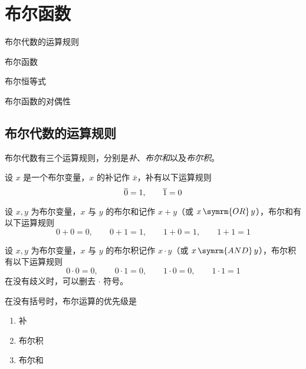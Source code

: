 \section{布尔函数}
\begin{introduction}
    \item 布尔代数的运算规则
    \item 布尔函数
    \item 布尔恒等式
    \item 布尔函数的对偶性
\end{introduction}

\subsection{布尔代数的运算规则}
布尔代数有三个运算规则，分别是\emph{补}、\emph{布尔和}以及\emph{布尔积}。

\begin{definition}[补]\label{def:补}
    设 $x$ 是一个布尔变量，$x$ 的补记作 $\bar{x}$，补有以下运算规则
    \begin{equation*}
        \bar{0} = 1, \qquad \bar{1} = 0 \\
    \end{equation*}
\end{definition}
\begin{definition}[布尔和]\label{def:布尔和}
    设 $x, y$ 为布尔变量，$x$ 与 $y$ 的布尔和记作 $x + y$（或 $x \mathop{\symrm{OR}} y$），布尔和有以下运算规则
    \begin{equation*}
        0 + 0 = 0, \qquad 0 + 1 = 1, \qquad 1 + 0 = 1, \qquad 1 + 1 = 1
    \end{equation*}
\end{definition}
\begin{definition}[布尔积]\label{def:布尔积}
    设 $x, y$ 为布尔变量，$x$ 与 $y$ 的布尔积记作 $x \cdot y$（或 $x \mathop{\symrm{AND}} y$），布尔积有以下运算规则
    \begin{equation*}
        0 \cdot 0 = 0, \qquad 0 \cdot 1 = 0, \qquad 1 \cdot 0 = 0, \qquad 1 \cdot 1 = 1
    \end{equation*}
    在没有歧义时，可以删去 $\cdot$ 符号。
\end{definition}

在没有括号时，布尔运算的优先级是
\begin{enumerate}
    \item 补
    \item 布尔积
    \item 布尔和
\end{enumerate}

